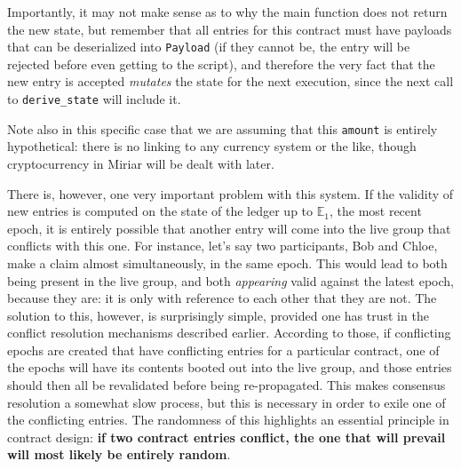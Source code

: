 \documentclass{extreport}
\begin{document}
Importantly, it may not make sense as to why the main function does not return the new state, but remember that all entries for this contract must have payloads that can be deserialized into \texttt{Payload} (if they cannot be, the entry will be rejected before even getting to the script), and therefore the very fact that the new entry is accepted \emph{mutates} the state for the next execution, since the next call to \texttt{derive\_state} will include it.

Note also in this specific case that we are assuming that this \texttt{amount} is entirely hypothetical: there is no linking to any currency system or the like, though cryptocurrency in Miriar will be dealt with later.

There is, however, one very important problem with this system. If the validity of new entries is computed on the state of the ledger up to \(\mathbb{E}_1\), the most recent epoch, it is entirely possible that another entry will come into the live group that conflicts with this one. For instance, let's say two participants, Bob and Chloe, make a claim almost simultaneously, in the same epoch. This would lead to both being present in the live group, and both \emph{appearing} valid against the latest epoch, because they are: it is only with reference to each other that they are not. The solution to this, however, is surprisingly simple, provided one has trust in the conflict resolution mechanisms described earlier. According to those, if conflicting epochs are created that have conflicting entries for a particular contract, one of the epochs will have its contents booted out into the live group, and those entries should then all be revalidated before being re-propagated. This makes consensus resolution a somewhat slow process, but this is necessary in order to exile one of the conflicting entries. The randomness of this highlights an essential principle in contract design: \textbf{if two contract entries conflict, the one that will prevail will most likely be entirely random}.
\end{document}
